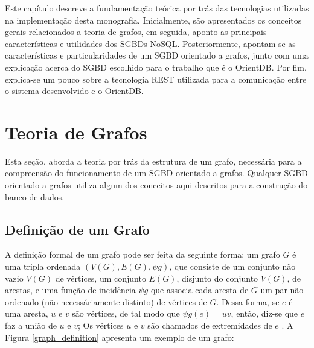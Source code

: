 \newcommand{\texCommand}[1]{\texttt{\textbackslash{#1}}}%

\newcommand{\exemplo}[1]{%
\vspace{\baselineskip}%
\noindent\fbox{\begin{minipage}{\textwidth}#1\end{minipage}}%
\\\vspace{\baselineskip}}%

\newcommand{\exemploVerbatim}[1]{%
\vspace{\baselineskip}%
\noindent\fbox{\begin{minipage}{\textwidth}%
#1\end{minipage}}%
\\\vspace{\baselineskip}}%

Este capítulo descreve a fundamentação teórica por trás das tecnologias utilizadas na implementação desta monografia. Inicialmente, são apresentados os conceitos gerais relacionados a teoria de grafos, em seguida, aponto as principais características e utilidades dos SGBDs NoSQL. Posteriormente, apontam-se as características e particularidades de um SGBD orientado a grafos, junto com uma explicação acerca do SGBD escolhido para o trabalho que é o OrientDB. Por fim, explica-se um pouco sobre a tecnologia REST utilizada para a comunicação entre o sistema desenvolvido e o OrientDB.

\section{Teoria de Grafos} \label{graph_theory}
	Esta seção, aborda a teoria por trás da estrutura de um grafo, necessária para a compreensão do funcionamento de um SGBD orientado a grafos. Qualquer SGBD orientado a grafos utiliza algum dos conceitos aqui descritos para a construção do banco de dados.

\subsection{Definição de um Grafo}
	A definição formal de um grafo pode ser feita da seguinte forma: um grafo \(G\) é uma tripla ordenada \((V(G), E(G), \psi g)\), que consiste de um conjunto não vazio \(V(G)\) de vértices, um conjunto \(E(G)\), disjunto do conjunto \(V(G)\), de arestas, e uma função de incidência \(\psi g\) que associa cada aresta de \(G\) um par não ordenado (não necessáriamente distinto) de vértices de \(G\). Dessa forma, se \(e\) é uma aresta, \(u\) e \(v\) são vértices, de tal modo que \(\psi g(e) = uv\), então, diz-se que \(e\) faz a união de \(u\) e \(v\); Os vértices \(u\) e \(v\) são chamados de extremidades de \(e\) \cite{bondy1976graph}. A Figura \ref{graph_definition} apresenta um exemplo de um grafo:
	
